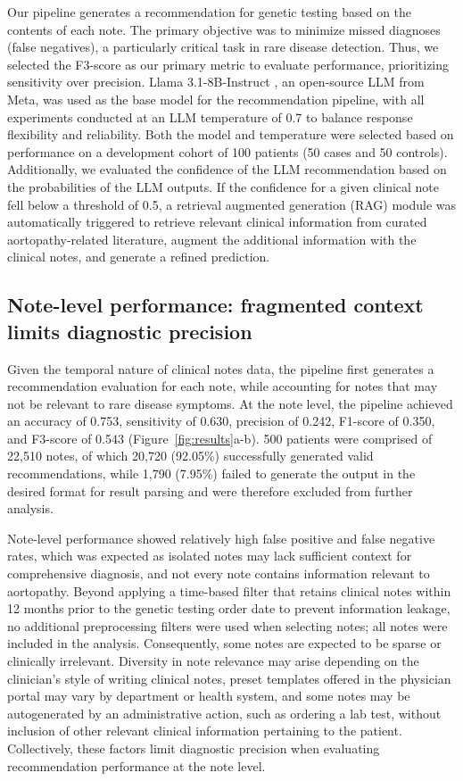 \documentclass[fleqn,10pt]{wlscirep}
\begin{document}
Our pipeline generates a recommendation for genetic testing based on the contents of each note. The primary objective was to minimize missed diagnoses (false negatives), a particularly critical task in rare disease detection. Thus, we selected the F3-score as our primary metric to evaluate performance, prioritizing sensitivity over precision. Llama 3.1-8B-Instruct \cite{grattafiori2024llama}, an open-source LLM from Meta, was used as the base model for the recommendation pipeline, with all experiments conducted at an LLM temperature of 0.7 to balance response flexibility and reliability. Both the model and temperature were selected based on performance on a development cohort of 100 patients (50 cases and 50 controls). Additionally, we evaluated the confidence of the LLM recommendation based on the probabilities of the LLM outputs. If the confidence for a given clinical note fell below a threshold of 0.5, a retrieval augmented generation (RAG) \cite{lewis2020retrieval} module was automatically triggered to retrieve relevant clinical information from curated aortopathy-related literature, augment the additional information with the clinical notes, and generate a refined prediction.

\subsection*{Note-level performance: fragmented context limits diagnostic precision}
Given the temporal nature of clinical notes data, the pipeline first generates a recommendation evaluation for each note, while accounting for notes that may not be relevant to rare disease symptoms. At the note level, the pipeline achieved an accuracy of 0.753, sensitivity of 0.630, precision of 0.242, F1-score of 0.350, and F3-score of 0.543 (Figure~\ref{fig:results}a-b). 500 patients were comprised of 22,510 notes, of which 20,720 (92.05\%) successfully generated valid recommendations, while 1,790 (7.95\%) failed to generate the output in the desired format for result parsing and were therefore excluded from further analysis. 

Note-level performance showed relatively high false positive and false negative rates, which was expected as isolated notes may lack sufficient context for comprehensive diagnosis, and not every note contains information relevant to aortopathy. Beyond applying a time-based filter that retains clinical notes within 12 months prior to the genetic testing order date to prevent information leakage, no additional preprocessing filters were used when selecting notes; all notes were included in the analysis. Consequently, some notes are expected to be sparse or clinically irrelevant. Diversity in note relevance may arise depending on the clinician’s style of writing clinical notes, preset templates offered in the physician portal may vary by department or health system, and some notes may be autogenerated by an administrative action, such as ordering a lab test, without inclusion of other relevant clinical information pertaining to the patient. Collectively, these factors limit diagnostic precision when evaluating recommendation performance at the note level.
\end{document}

